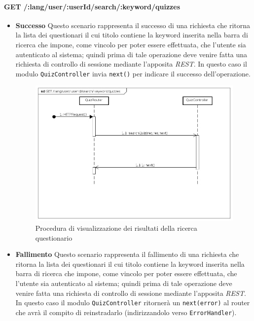 \paragraph{GET /:lang/user/:userId/search/:keyword/quizzes}
\begin{itemize}
\item \textbf{Successo}
Questo scenario rappresenta il successo di una richiesta che ritorna la lista dei questionari il cui titolo contiene la keyword inserita nella barra di ricerca che impone, come vincolo per poter essere effettuata, che l'utente sia autenticato al sistema; quindi prima di tale operazione deve venire fatta una richiesta di controllo di sessione mediante l'apposita \textit{REST}. In questo caso il modulo \texttt{QuizController} invia \texttt{next()} per indicare il successo dell'operazione.

\begin{figure}[ht]
	\centering
	\includegraphics[scale=0.45]{UML/DiagrammiDiSequenza/Back-end/GET__lang_user__userId_search__keyword_quizzes_success.png}
	\caption{Procedura di visualizzazione dei risultati della ricerca questionario}
\end{figure}
\FloatBarrier

\item \textbf{Fallimento}
Questo scenario rappresenta il fallimento di una richiesta che ritorna la lista dei questionari il cui titolo contiene la keyword inserita nella barra di ricerca che impone, come vincolo per poter essere effettuata, che l'utente sia autenticato al sistema; quindi prima di tale operazione deve venire fatta una richiesta di controllo di sessione mediante l'apposita \textit{REST}. In questo caso il modulo \texttt{QuizController} ritornerà un \texttt{next(error)} al router che avrà il compito di reinstradarlo (indirizzandolo verso \texttt{ErrorHandler}).


\end{itemize}
